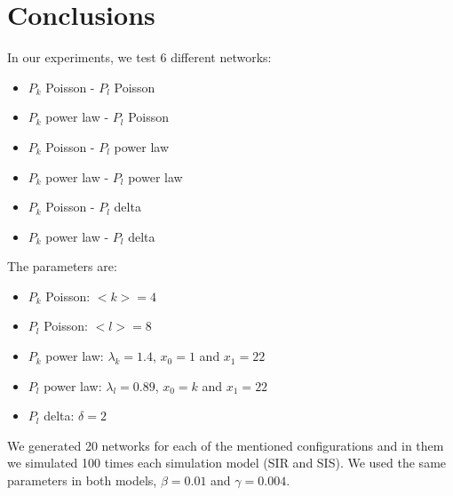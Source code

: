 \section{Conclusions}
In our experiments, we test 6 different networks:
\begin{itemize}
    \item $P_k$ Poisson - $P_l$ Poisson
    \item $P_k$ power law - $P_l$ Poisson
    \item $P_k$ Poisson - $P_l$ power law 
    \item $P_k$ power law - $P_l$ power law
    \item $P_k$ Poisson - $P_l$ delta
    \item $P_k$ power law - $P_l$ delta
\end{itemize}
The parameters are:
\begin{itemize}
    \item $P_k$ Poisson: $<k> = 4$
    \item $P_l$ Poisson: $<l> = 8$
    \item $P_k$ power law: $\lambda_k=1.4$, $x_0=1$ and $x_1=22$
    \item $P_l$ power law: $\lambda_l=0.89$, $x_0=k$ and $x_1=22$
    \item $P_l$ delta: $\delta = 2$
\end{itemize}
We generated 20 networks for each of the mentioned configurations and in them we simulated 100 times each simulation model (SIR and SIS). We used the same parameters in both models, $\beta = 0.01$ and $\gamma = 0.004$.